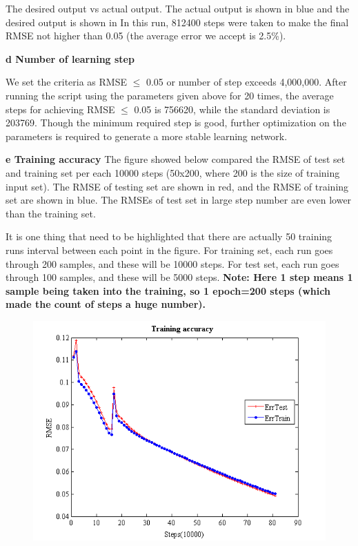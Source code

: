 \documentclass[epsfig]{article}
\def\bpar{\vskip26pt}
\def\npar{\vskip13pt}
\def\spar{\vskip10pt}
\begin{document}
The desired output vs actual output. The actual output is shown in blue and the desired output is shown in  In this run, 812400 steps were taken to make the final RMSE not higher than 0.05 (the average error we accept is 2.5\%).

{\bf 
\npar
d Number of learning step
\bpar
}

We set the criteria as RMSE $\le$ 0.05 or number of step exceeds 4,000,000. After running the script using the parameters given above for 20 times, the average steps for achieving RMSE $\le$ 0.05 is 756620, while the standard deviation is 203769. Though the minimum required step is good, further optimization on the parameters is required to generate a more stable learning network.
 \spar

{\bf 
\npar
e Training accuracy
\bpar
}
The figure showed below compared the RMSE of test set and training set per each 10000 steps (50x200, where 200 is the size of training input set). The RMSE of testing set are shown in red, and the RMSE of training set are shown in blue. The RMSEs of test set in large step number are even lower than the training set.

It is one thing that need to be highlighted that there are actually 50 training runs interval between each point in the figure. For training set, each run goes through 200 samples, and these will be 10000 steps. For test set, each run goes through 100 samples, and these will be 5000 steps. 
 \spar
{\bf Note: Here 1 step means 1 sample being taken into the training, so 1 epoch=200 steps (which made the count of steps a huge number).} 

 \begin{figure}[!htb] 
\centering\includegraphics[width=4.5in]{fig3.png} 
\end{figure} 
\end{document}
